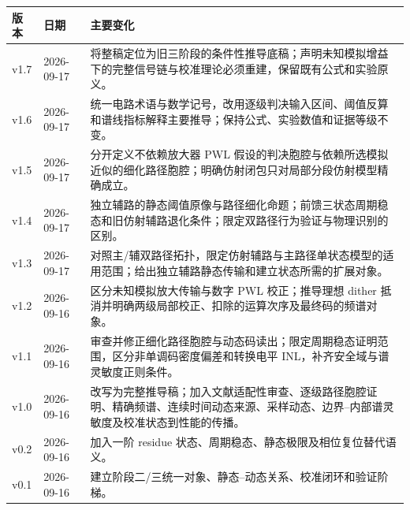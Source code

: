 \documentclass[11pt,a4paper]{ctexart}
\theoremstyle{adcplain}
\theoremstyle{definition}
\begin{document}
\noindent\begin{tabularx}{\textwidth}{p{20mm}p{27mm}X}
\toprule
版本 & 日期 & 主要变化 \\
\midrule
v1.7 & 2026-09-17 & 将整稿定位为旧三阶段的条件性推导底稿；声明未知模拟增益下的完整信号链与校准理论必须重建，保留既有公式和实验原义。 \\
v1.6 & 2026-09-17 & 统一电路术语与数学记号，改用逐级判决输入区间、阈值反算和谱线指标解释主要推导；保持公式、实验数值和证据等级不变。 \\
v1.5 & 2026-09-17 & 分开定义不依赖放大器 PWL 假设的判决胞腔与依赖所选模拟近似的细化路径胞腔；明确仿射闭包只对局部分段仿射模型精确成立。 \\
v1.4 & 2026-09-17 & 独立辅路的静态阈值原像与路径细化命题；前馈三状态周期稳态和旧仿射辅路退化条件；限定双路径行为验证与物理识别的区别。 \\
v1.3 & 2026-09-17 & 对照主/辅双路径拓扑，限定仿射辅路与主路径单状态模型的适用范围；给出独立辅路静态传输和建立状态所需的扩展对象。 \\
v1.2 & 2026-09-16 & 区分未知模拟放大传输与数字 PWL 校正；推导理想 dither 抵消并明确两级局部校正、扣除的运算次序及最终码的频谱对象。 \\
v1.1 & 2026-09-16 & 审查并修正细化路径胞腔与动态码读出；限定周期稳态证明范围，区分非单调码密度偏差和转换电平 INL，补齐安全域与谱灵敏度正则条件。 \\
v1.0 & 2026-09-16 & 改写为完整推导稿；加入文献适配性审查、逐级路径胞腔证明、精确频谱、连续时间动态来源、采样动态、边界--内部谱灵敏度及校准状态到性能的传播。 \\
v0.2 & 2026-09-16 & 加入一阶 residue 状态、周期稳态、静态极限及相位复位替代语义。 \\
v0.1 & 2026-09-16 & 建立阶段二/三统一对象、静态--动态关系、校准闭环和验证阶梯。 \\
\bottomrule
\end{tabularx}

\clearpage
\begingroup
\small


\endgroup
\end{document}
